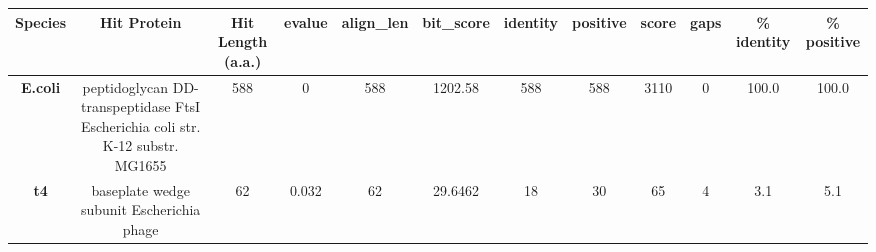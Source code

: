 \begin{tabular}{|c|c|c|c|c|c|c|c|c|c|c|c|} \hline
\textbf{Species} & \textbf{Hit Protein} & \textbf{Hit Length (a.a.)} & \textbf{evalue} & \textbf{align\_len} & \textbf{bit\_score} & \textbf{identity} & \textbf{positive} & \textbf{score} & \textbf{gaps} & \textbf{\% identity} & \textbf{\% positive} \\ \hline
\textbf{E.coli} & peptidoglycan DD-transpeptidase FtsI Escherichia coli str. K-12 substr. MG1655 & 588 & 0 & 588 & 1202.58 & 588 & 588 & 3110 & 0 & 100.0 & 100.0\\
\textbf{t4} & baseplate wedge subunit Escherichia phage  & 62 & 0.032 & 62 & 29.6462 & 18 & 30 & 65 & 4 & 3.1 & 5.1\\
\hline \end{tabular}
